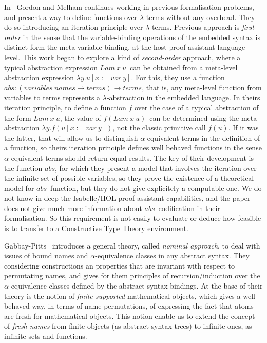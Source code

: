 \documentclass{entcs}
\newcommand{\alp}{\ensuremath{\alpha}}
\newcommand{\lamb}{\ensuremath{\lambda}}
\begin{document}
In~\cite{DBLP:conf/tphol/GordonM96} Gordon and Melham continues working in previous formalisation problems, and present a way to define functions over \lamb-terms without any overhead. They do so introducing an iteration principle over \lamb-terms. Previous approach is \emph{first-order} in the sense that the variable-binding operations of the embedded syntax is distinct form the meta variable-binding, at the host proof assistant language level. This work began to explore a kind of \emph{second-order} approach, where a typical abstraction expression $Lam\ x\ u$\ can be obtained from a meta-level abstraction expression $\lambda y . u [x := var\ y]$. For this, they use a function $abs : (variables\ names \rightarrow terms) \rightarrow terms$, that is, any meta-level function from variables to terms represents a \lamb-abstraction in the embedded language. In theirs iteration principle, to define a function $f$ over the case of a typical abstraction of the form $Lam\ x\ u$, the value of $f(Lam\ x\ u)$\ can be determined using the meta-abstraction $\lambda y . f(u [ x := var\ y ])$, not the classic primitive call $f(u)$. If it was the latter, that will allow us to distinguish \alp-equivalent terms in the definition of a function, so theirs iteration principle defines well behaved functions in the sense \alp-equivalent terms should return equal results. The key of their development is the function $abs$, for which they present a model that involves the iteration over the infinite set of possible variables, so they prove the existence of a theoretical model for $abs$\ function, but they do not give explicitely a computable one. We do not know in deep the Isabelle/HOL proof assistant capabilities, and the paper does not give much more information about $abs$\ codification in their formalisation. So this requirement is not easily to evaluate or deduce how feasible is to transfer to a Constructive Type Theory environment. 

Gabbay-Pitts~\cite{GP02:newapproach} introduces a general theory, called \emph{nominal approach}, to deal with issues of bound names and \alp-equivalence classes in any abstract syntax. They considering constructions an properties that are invariant with respect to permutating names, and gives for them principles of recursion/induction over the \alp-equivalence classes defined by the abstract syntax bindings. At the base of their theory is the notion of \emph{finite supported} mathematical objects, which gives a well-behaved way, in terms of name-permutations, of expressing the fact that atoms are fresh for mathematical objects. This notion enable us to extend the concept of \emph{fresh names} from finite objects (as abstract syntax trees) to infinite ones, as infinite sets and functions.
\end{document}
